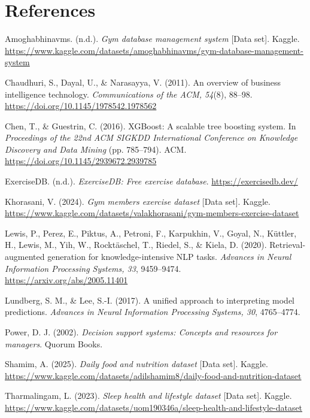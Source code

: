 \documentclass[11pt,a4paper]{article}
\begin{document}
\section*{References}
\vspace{2pt}
\footnotesize
\setlength{\parskip}{2pt}
\begin{list}{}{\setlength{\leftmargin}{1.5em}\setlength{\itemindent}{-1.5em}\setlength{\itemsep}{2pt}\setlength{\parsep}{0pt}\setlength{\topsep}{0pt}}
\item Amoghabhinavms. (n.d.). \emph{Gym database management system} [Data set]. Kaggle. \url{https://www.kaggle.com/datasets/amoghabhinavms/gym-database-management-system}
\item Chaudhuri, S., Dayal, U., \& Narasayya, V. (2011). An overview of business intelligence technology. \emph{Communications of the ACM, 54}(8), 88--98. \url{https://doi.org/10.1145/1978542.1978562}
\item Chen, T., \& Guestrin, C. (2016). XGBoost: A scalable tree boosting system. In \emph{Proceedings of the 22nd ACM SIGKDD International Conference on Knowledge Discovery and Data Mining} (pp. 785--794). ACM. \url{https://doi.org/10.1145/2939672.2939785}
\item ExerciseDB. (n.d.). \emph{ExerciseDB: Free exercise database}. \url{https://exercisedb.dev/}
\item Khorasani, V. (2024). \emph{Gym members exercise dataset} [Data set]. Kaggle. \url{https://www.kaggle.com/datasets/valakhorasani/gym-members-exercise-dataset}
\item Lewis, P., Perez, E., Piktus, A., Petroni, F., Karpukhin, V., Goyal, N., K\"uttler, H., Lewis, M., Yih, W., Rockt\"aschel, T., Riedel, S., \& Kiela, D. (2020). Retrieval-augmented generation for knowledge-intensive NLP tasks. \emph{Advances in Neural Information Processing Systems, 33}, 9459--9474. \url{https://arxiv.org/abs/2005.11401}
\item Lundberg, S. M., \& Lee, S.-I. (2017). A unified approach to interpreting model predictions. \emph{Advances in Neural Information Processing Systems, 30}, 4765--4774.
\item Power, D. J. (2002). \emph{Decision support systems: Concepts and resources for managers}. Quorum Books.
\item Shamim, A. (2025). \emph{Daily food and nutrition dataset} [Data set]. Kaggle. \url{https://www.kaggle.com/datasets/adilshamim8/daily-food-and-nutrition-dataset}
\item Tharmalingam, L. (2023). \emph{Sleep health and lifestyle dataset} [Data set]. Kaggle. \url{https://www.kaggle.com/datasets/uom190346a/sleep-health-and-lifestyle-dataset}
\end{list}
\end{document}
